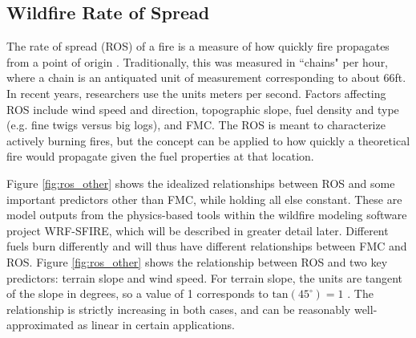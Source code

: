 \documentclass[11pt]{article}%
\begin{document}
\subsection{Wildfire Rate of Spread}

The rate of spread (ROS) of a fire is a measure of how quickly fire propagates from a point of origin \citep[e.g.,][]{NFSC-2024-MFB}. Traditionally, this was measured in ``chains" per hour, where a chain is an antiquated unit of measurement corresponding to about 66ft. In recent years, researchers use the units meters per second. Factors affecting ROS include wind speed and direction, topographic slope, fuel density and type (e.g. fine twigs versus big logs), and FMC. The ROS is meant to characterize actively burning fires, but the concept can be applied to how quickly a theoretical fire would propagate given the fuel properties at that location. 

Figure \ref{fig:ros_other} shows the idealized relationships between ROS and some important predictors other than FMC, while holding all else constant. These are model outputs from the physics-based tools within the wildfire modeling software project WRF-SFIRE, which will be described in greater detail later. Different fuels burn differently and will thus have different relationships between FMC and ROS. Figure \ref{fig:ros_other} shows the relationship between ROS and two key predictors: terrain slope and wind speed. For terrain slope, the units are tangent of the slope in degrees, so a value of 1 corresponds to $\text{tan} (45^\circ) = 1$  \citep{OpenWFM-2024-HTD}. The relationship is strictly increasing in both cases, and can be reasonably well-approximated as linear in certain applications.
\end{document}
